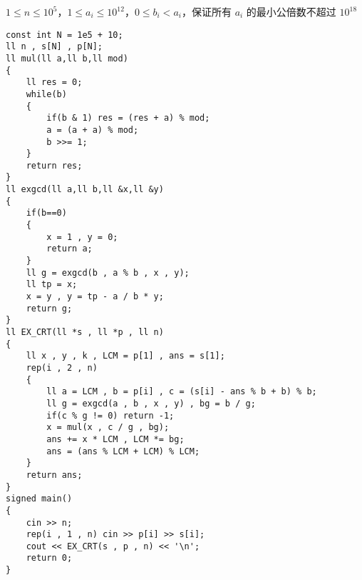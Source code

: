 \documentclass[E:/GsjzTle/main/main.tex]{subfiles}
\begin{document}
\(1 \le n \le {10}^5\)，\(1 \le a_i \le {10}^{12}\)，\(0 \le b_i < a_i\)，保证所有
\(a_i\) 的最小公倍数不超过 \({10}^{18}\)

\begin{lstlisting}
const int N = 1e5 + 10;
ll n , s[N] , p[N];
ll mul(ll a,ll b,ll mod)
{
	ll res = 0;
	while(b)
	{
		if(b & 1) res = (res + a) % mod;
		a = (a + a) % mod;
		b >>= 1;
	}
	return res;
}
ll exgcd(ll a,ll b,ll &x,ll &y)
{
	if(b==0)
	{
		x = 1 , y = 0;
		return a;
	}
	ll g = exgcd(b , a % b , x , y);
	ll tp = x;
	x = y , y = tp - a / b * y;
	return g;
}
ll EX_CRT(ll *s , ll *p , ll n)
{
	ll x , y , k , LCM = p[1] , ans = s[1];
	rep(i , 2 , n)
	{
		ll a = LCM , b = p[i] , c = (s[i] - ans % b + b) % b;
		ll g = exgcd(a , b , x , y) , bg = b / g;
		if(c % g != 0) return -1;
		x = mul(x , c / g , bg);
		ans += x * LCM , LCM *= bg;
		ans = (ans % LCM + LCM) % LCM;
	}
	return ans;
}
signed main()
{
	cin >> n;
	rep(i , 1 , n) cin >> p[i] >> s[i];
	cout << EX_CRT(s , p , n) << '\n';
	return 0;
}
\end{lstlisting}
\end{document}
